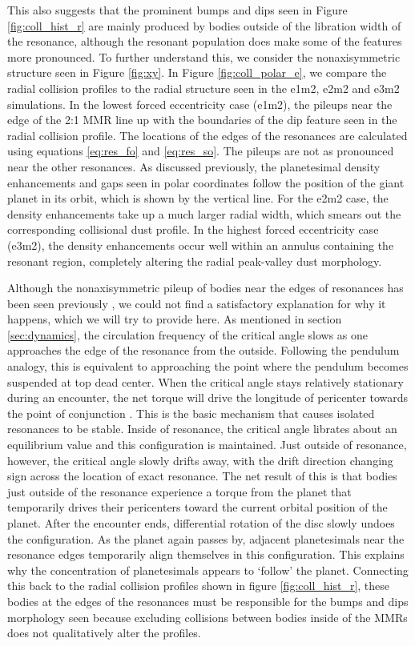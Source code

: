 This also suggests that the prominent bumps and dips seen in Figure \ref{fig:coll_hist_r} are mainly produced by bodies outside 
of the libration width of the resonance, although the resonant population does make some of the features more pronounced. To 
further understand this, we consider the nonaxisymmetric structure seen in Figure \ref{fig:xy}. In Figure \ref{fig:coll_polar_e}, we 
compare the radial collision profiles to the radial structure seen in the e1m2, e2m2 and e3m2 simulations. In the lowest forced 
eccentricity case (e1m2), the pileups near the edge of the 2:1 MMR line up with the boundaries of the dip feature seen in the 
radial collision profile. The locations of the edges of the resonances are calculated using equations \ref{eq:res_fo} and 
\ref{eq:res_so}. The pileups are not as pronounced near the other resonances. As discussed previously, the planetesimal density 
enhancements and gaps seen in polar coordinates follow the position of the giant planet in its orbit, which is shown by the 
vertical line. For the e2m2 case, the density enhancements take up a much larger radial width, which smears out the 
corresponding collisional dust profile. In the highest forced eccentricity case (e3m2), the density enhancements occur well within 
an annulus containing the resonant region, completely altering the radial peak-valley dust morphology.

Although the nonaxisymmetric pileup of bodies near the edges of resonances has been seen previously \cite{richardson00, tabeshian16}, we could not find a satisfactory explanation for why it happens, which we will try to provide 
here. As mentioned in section \ref{sec:dynamics}, the circulation frequency of the critical angle slows as one approaches the 
edge of the resonance from the outside. Following the pendulum analogy, this is equivalent to approaching the point where the 
pendulum becomes suspended at top dead center. When the critical angle stays relatively stationary during an encounter, 
the net torque will drive the longitude of pericenter towards the point of conjunction \cite{peale76}.  This is the basic mechanism 
that causes isolated resonances to be stable. Inside of resonance, the critical angle librates about an equilibrium value and this 
configuration is maintained. Just outside of resonance, however, the critical angle slowly drifts away, with the drift direction 
changing sign across the location of exact resonance. The net result of this is that bodies just outside of the resonance 
experience a torque from the planet that temporarily drives their pericenters toward the current orbital position of the planet. After 
the encounter ends, differential rotation of the disc slowly undoes the configuration. As the planet again passes by, adjacent 
planetesimals near the resonance edges temporarily align themselves in this configuration. This explains why the concentration 
of planetesimals appears to `follow' the planet. Connecting this back to the radial collision profiles shown in figure 
\ref{fig:coll_hist_r}, these bodies at the edges of the resonances must be responsible for the bumps and dips morphology seen 
because excluding collisions between bodies inside of the MMRs does not qualitatively alter the profiles.

